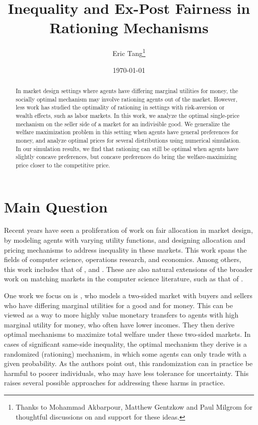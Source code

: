 \documentclass[AER]{AEA}
\begin{document}
\title{Inequality and Ex-Post Fairness in Rationing Mechanisms}
\author{Eric Tang\thanks{%
Thanks to Mohammad Akbarpour, Matthew Gentzkow and Paul Milgrom for thoughtful discussions on and support for these ideas.}}
\date{\today}
\JEL{}
\Keywords{}

\begin{abstract}
    In market design settings where agents have differing marginal utilities for money, the socially optimal mechanism may involve rationing agents out of the market. However, less work has studied the optimality of rationing in settings with risk-aversion or wealth effects, such as labor markets. In this work, we analyze the optimal single-price mechanism on the seller side of a market for an indivisible good. We generalize the welfare maximization problem in this setting when agents have general preferences for money, and analyze optimal prices for several distributions using numerical simulation. In our simulation results, we find that rationing can still be optimal when agents have slightly concave preferences, but concave preferences do bring the welfare-maximizing price closer to the competitive price.
\end{abstract}

\maketitle

\section{Main Question}

Recent years have seen a proliferation of work on fair allocation in market design, by modeling agents with varying utility functions, and designing allocation and pricing mechanisms to address inequality in these markets. This work spans the fields of computer science, operations research, and economics. Among others, this work includes that of \cite{babaioff-2019}, \cite{akbarpour-2020} and \cite{budish-2011}. These are also natural extensions of the broader work on matching markets in the computer science literature, such as that of \cite{alaei-2017}.

One work we focus on is \cite{dworczak-2020}, who models a two-sided market with buyers and sellers who have differing marginal utilities for a good and for money. This can be viewed as a way to more highly value monetary transfers to agents with high marginal utility for money, who often have lower incomes. They then derive optimal mechanisms to maximize total welfare under these two-sided markets. In cases of significant same-side inequality, the optimal mechanism they derive is a randomized (rationing) mechanism, in which some agents can only trade with a given probability. As the authors point out, this randomization can in practice be harmful to poorer individuals, who may have less tolerance for uncertainty. This raises several possible approaches for addressing these harms in practice.
\end{document}
